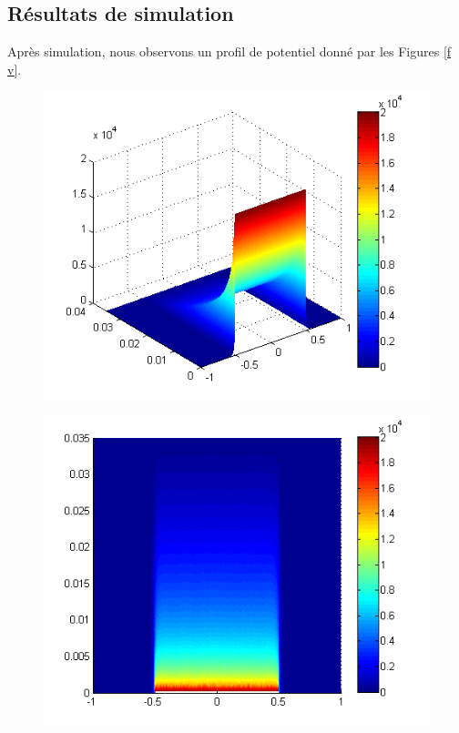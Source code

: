 \documentclass[a4paper,12pt]{article}
\begin{document}
\subsection{Résultats de simulation}
Après simulation, nous observons un profil de potentiel donné par les Figures \ref{f v}.

\begin{figure}[h]
   \begin{minipage}[c]{.32\linewidth}
      \includegraphics[width=1\textwidth,height=0.8\textwidth]{images/v_3d}
      \label{f v_3d}
   \end{minipage} \hfill
   \begin{minipage}[c]{.32\linewidth}
      \includegraphics[width=1\textwidth,height=0.8\textwidth]{images/v_xy}

\end{minipage}
\end{figure}
\end{document}
